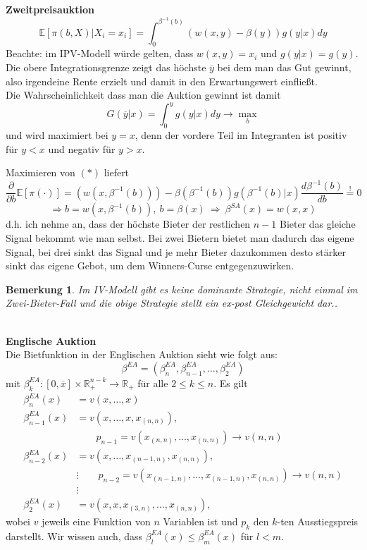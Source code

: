 \documentclass[12pt]{extreport} %
\newcommand{\R}{\mathbb{R}}
\theoremstyle{named}
\theoremstyle{itshape}
\theoremstyle{normal}
\newtheorem*{bemerkung}{Bemerkung}
\begin{document}
\textbf{Zweitpreisauktion} 
\begin{equation*}
	\mathds{E} \left[ \pi (b, X) \big| X_{i} = x_{i} \right] = \int_{0}^{\beta^{-1}(b)} \left( w(x,y) - \beta(y) \right) g\left(y | x \right) dy \tag*{$(*)$}
\end{equation*} 
Beachte: im IPV-Modell würde gelten, dass $w(x,y) = x_{i}$ und $ g\left(y | x \right) =  g\left(y \right)$. Die obere Integrationsgrenze zeigt das höchste $\overline{y}$ bei dem man das Gut gewinnt, also irgendeine Rente erzielt und damit in den Erwartungswert einfließt. ~\\

Die Wahrscheinlichkeit dass man die Auktion gewinnt ist damit
$$ G \left(\overline{y} | x \right) = \int_{0}^{y} g \left(y | x \right) dy \longrightarrow \max_{b} $$
und wird maximiert bei $y = x$, denn der vordere Teil im Integranten ist positiv für $y < x$ und negativ für $y > x$.

Maximieren von $(*)$ liefert
$$ \frac{\partial}{\partial b} \mathds{E} \left[ \pi(\cdot) \right] = \left( w(x, \beta^{-1}(b)) \right) - \beta \left( \beta^{-1}(b) \right) g\left( \beta^{-1}(b) | x \right)  \frac{d\beta^{-1}(b)}{db} \overset{!}{=} 0 $$
$$ \Rightarrow b = w\left( x, \beta^{-1}(b) \right), ~b = \beta(x) ~\Rightarrow~ \beta^{SA}(x) = w(x,x) $$
d.h. ich nehme an, dass der höchste Bieter der restlichen $n-1$ Bieter das gleiche Signal bekommt wie man selbst. Bei zwei Bietern bietet man dadurch das eigene Signal, bei drei sinkt das Signal und je mehr Bieter dazukommen desto stärker sinkt das eigene Gebot, um dem Winners-Curse entgegenzuwirken.

\begin{bemerkung}
	Im IV-Modell gibt es keine dominante Strategie, nicht einmal im Zwei-Bieter-Fall und die obige Strategie stellt ein ex-post Gleichgewicht dar..	
\end{bemerkung} ~\\
\textbf{Englische Auktion} ~\\
Die Bietfunktion in der Englischen Auktion sieht wie folgt aus:
	$$ \beta^{EA} = \left( \beta^{EA}_{n}, \beta^{EA}_{n-1}, \dotsc, \beta^{EA}_{2} \right) $$
mit $\beta^{EA}_{k} \colon [0, \overline{x}] \times \R^{n-k}_{+} \rightarrow \R_{+}$ für alle $2 \leq k \leq n$. Es gilt
\begin{align*}
	\beta^{EA}_{n}(x) & = v(x, \dotsc, x) \\
	\beta^{EA}_{n-1}(x) & = v(x, \dotsc, x, x_{(n,n)}), \\ 
	& \qquad p_{n-1} = v(x_{(n,n)}, \dotsc, x_{(n,n)}) \rightarrow v(n,n) \\
	\beta^{EA}_{n-2}(x) & = v(x, \dotsc, x_{(n-1,n)}, x_{(n,n)}), \\
	& \vdots \qquad p_{n-2} = v(x_{(n-1,n)}, \dotsc, x_{(n-1,n)}, x_{(n,n)}) \rightarrow v(n,n) \\	
	& \vdots \\
		\beta^{EA}_{2}(x) & = v(x, x, x_{(3, n)}, \dotsc, x_{(n,n)}),
\end{align*}
wobei $v$ jeweils eine Funktion von $n$ Variablen ist und $p_{k}$ den $k$-ten Ausstiegspreis darstellt. Wir wissen auch, dass $\beta_{l}^{EA}(x) \leq \beta_{m}^{EA}(x)$ für $l < m$. ~\\
\end{document}
